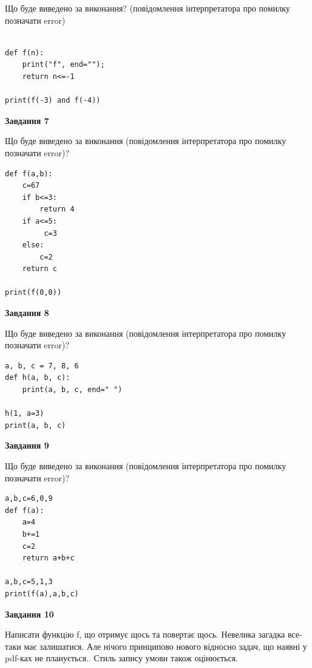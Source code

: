 \documentclass[12pt, ukrainian]{article}
\begin{document}
{\begin {large}
Що буде виведено за виконання? (повідомлення інтерпретатора про помилку позначати error)\par
\begin{verbatim}

def f(n):
    print("f", end="");
    return n<=-1

print(f(-3) and f(-4))
\end{verbatim}

{\begin {center}\textbf{Завдання 7}\end {center}}

Що буде виведено за виконання (повідомлення інтерпретатора про помилку позначати error)?\par
\begin{verbatim}
def f(a,b):
    c=67
    if b<=3:
        return 4
    if a<=5:
         c=3
    else: 
        c=2
    return c

print(f(0,0))
\end{verbatim}

{\begin {center}\textbf{Завдання 8}\end {center}}

Що буде виведено за виконання (повідомлення інтерпретатора про помилку позначати error)?\par
\begin{verbatim}
a, b, c = 7, 8, 6
def h(a, b, c):
    print(a, b, c, end=" ")

h(1, a=3)
print(a, b, c)
\end{verbatim}

{\begin {center}\textbf{Завдання 9}\end {center}}

Що буде виведено за виконання (повідомлення інтерпретатора про помилку позначати error)?\par
\begin{verbatim}
a,b,c=6,0,9
def f(a):
    a=4
    b+=1
    c=2
    return a+b+c

a,b,c=5,1,3
print(f(a),a,b,c)
\end{verbatim}

{\begin {center}\textbf{Завдання 10}\end {center}}


Написати функцiю f, що отримує щось та повертає щось. Невелика загадка все-таки має залишатися. Але нічого принципово нового відносно задач, що наявні у pdf-ках не планується.. Стиль запису умови також оцінюється.\par
\end {large}}
\newpage
\end{document}
